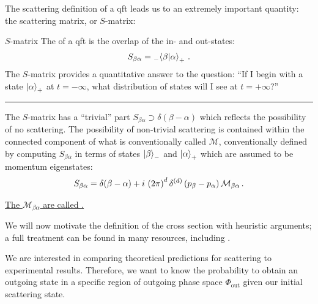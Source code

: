The scattering definition of a \gls{qft} leads us to an extremely important quantity:
%
the scattering matrix, or \(S\)-matrix:

\begin{definitionbox}{\(S\)-matrix}{}
    The  of a \gls{qft} is the overlap of the in- and out-states:
    \begin{align}
        S_{\beta \alpha}
        =
        {}_-\!\braket{\beta}{\alpha}_+
        \,.
    \end{align}
    The \(S\)-matrix provides a quantitative answer to the question:
    ``If I begin with a state \(\ket{\alpha}_+\) at \(t = -\infty\), what distribution of states will I see at \(t = +\infty\)?''

    \vspace{7pt}
    \hrule
    \vspace{7pt}

    The \(S\)-matrix has a ``trivial'' part \(S_{\beta\alpha} \supset \delta(\beta - \alpha)\) which reflects the possibility of no scattering.
    The possibility of non-trivial scattering is contained within the connected component of what is conventionally called \(\mathcal{M}\), conventionally defined by computing \(S_{\beta\alpha}\) in terms of states \(\ket{\beta}_-\) and \(\ket{\alpha}_+\) which are assumed to be momentum eigenstates:
    \begin{align}
        S_{\beta \alpha}
        =
        \delta(\beta - \alpha)
        +
        i\,
        \left(2\pi\right)^d \delta^{(d)}\left(p_\beta - p_\alpha\right)
        \mathcal{M}_{\beta\alpha}
        \,.
    \end{align}

    \underline{The \(\mathcal{M}_{\beta\alpha}\) are called .}
\end{definitionbox}

We will now motivate the definition of the cross section with heuristic arguments;
%
a full treatment can be found in many resources, including \sam{}.

We are interested in comparing theoretical predictions for scattering to experimental results.
%
Therefore, we want to know the probability to obtain an outgoing state in a specific region of outgoing phase space \(\Phi_\text{out}\) given our initial scattering state.

